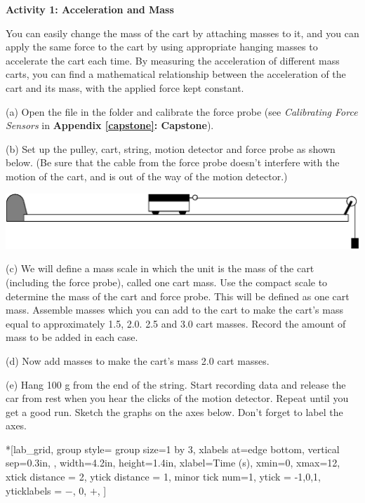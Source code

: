 \medskip
\textbf{Activity 1: Acceleration and Mass }

You can easily change the mass of the cart by attaching masses to it, and you
can apply the same force to the cart by using appropriate hanging masses to
accelerate the cart each time. By measuring the acceleration of different mass
carts, you can find a mathematical relationship between the acceleration of
the cart and its mass, with the applied force kept constant.

(a) Open the file   in the \filename{\coursefolder} folder and calibrate the force probe (see \textit{Calibrating Force Sensors} in \textbf{Appendix \ref{capstone}: Capstone}).
\medskip

(b) Set up the pulley, cart, string, motion detector and force probe as shown
below. (Be sure that the cable from the force probe doesn't interfere with the
motion of the cart, and is out of the way of the motion detector.)
\bigskip

\answerspace{0.5cm}
{\par\centering \includegraphics{force1/force1_fig4.eps} \par}
\answerspace{0.5cm}

(c) We will define a mass scale in which the unit is the mass of the cart (including the force probe), called one cart mass. Use the compact scale to determine the mass of the cart and force probe. This will be defined as one cart mass. Assemble masses which you can add to the cart to make the cart's mass equal to approximately 1.5, 2.0. 2.5 and 3.0 cart masses. Record the amount of mass to be added in each case.
\answerspace{1in}

(d) Now add masses to make the cart's mass 2.0 cart masses.

\pagebreak[3]
(e) Hang 100 g from the end of the string.
Start recording data and release the car from rest when you hear the clicks
of the motion detector. Repeat until you get a good run. Sketch the graphs on
the axes below. Don't forget to label the axes.

\begin{lab_groupplot}*{}[lab_grid,
	group style={
		group size=1 by 3,
		xlabels at=edge bottom,
		vertical sep=0.3in,
		},
	width=4.2in,  height=1.4in,
	xlabel=Time (s),
	xmin=0, xmax=12,
	xtick distance = 2, 
	ytick distance = 1, 
	minor tick num=1,
	ytick = {-1,0,1},
	yticklabels = {$-$, 0, $+$},
	]
\nextgroupplot[
	ymin=-1,ymax=1, 
	ylabel={Velocity (m/s)},
	]
\nextgroupplot[
	ymin=-1,ymax=1, 
	ylabel={Acceleration (m/s$^2$)},
	]
\nextgroupplot[
	ymin=-1,ymax=1, 
	ylabel={Force (N)},
	]
\end{lab_groupplot}

